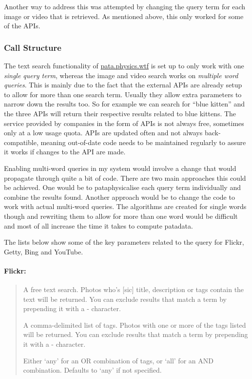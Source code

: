 Another way to address this was attempted by changing the query term for each image or video that is retrieved. As mentioned above, this only worked for some of the \ac{API}s.


\subsubsection{Call Structure}

The text search functionality of \url{pata.physics.wtf} is set up to only work with one \emph{single query term}, whereas the image and video search works on \emph{multiple word queries}. This is mainly due to the fact that the external \ac{API}s are already setup to allow for more than one search term. Usually they allow extra parameters to narrow down the results too. So for example we can search for ``blue kitten'' and the three \ac{API}s will return their respective results related to blue kittens. The service provided by companies in the form of \ac{API}s is not always free, sometimes only at a low usage quota. \ac{API}s are updated often and not always back-compatible, meaning out-of-date code needs to be maintained regularly to assure it works if changes to the \ac{API} are made.

Enabling multi-word queries in my system would involve a change that would propagate through quite a bit of code. There are two main approaches this could be achieved. One would be to pataphysicalise each query term individually and combine the results found. Another approach would be to change the code to work with actual multi-word queries. The algorithms are created for single words though and rewriting them to allow for more than one word would be difficult and most of all increase the time it takes to compute patadata.

The lists below show some of the key parameters related to the query for Flickr, Getty, Bing and YouTube.

\paragraph{Flickr:}
\begin{quotation}
  \begin{description}
  \vspace{-1cm}
    \item[text (Optional)] A free text search. Photos who's [sic] title, description or tags contain the text will be returned. You can exclude results that match a term by prepending it with a - character.
    \item[tags (Optional)] A comma-delimited list of tags. Photos with one or more of the tags listed will be returned. You can exclude results that match a term by prepending it with a - character.
    \item[tag\_mode (Optional)] Either `any' for an OR combination of tags, or `all' for an AND combination. Defaults to `any' if not specified.
  \end{description}
\end{quotation}

